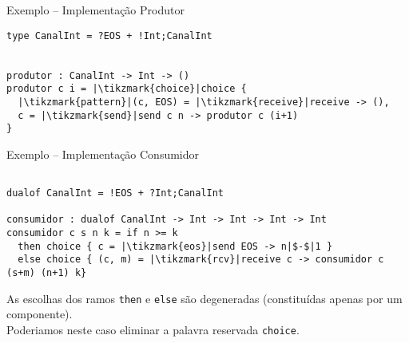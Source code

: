 \begin{frame}[fragile]{Exemplo -- Implementação  \hfill \color{mLightBrown}Produtor}
  \begin{lstlisting}[xleftmargin=.15\textwidth, xrightmargin=.15\textwidth]
type CanalInt = ?EOS + !Int;CanalInt

    
produtor : CanalInt -> Int -> ()
produtor c i = |\tikzmark{choice}|choice {
  |\tikzmark{pattern}|(c, EOS) = |\tikzmark{receive}|receive -> (),
  c = |\tikzmark{send}|send c n -> produtor c (i+1)
}
  \end{lstlisting}


  
\end{frame}


\begin{frame}[fragile]{Exemplo -- Implementação  \hfill \color{mLightBrown}Consumidor}
  \begin{lstlisting}[xleftmargin=-.04\textwidth]

dualof CanalInt = !EOS + ?Int;CanalInt
    
consumidor : dualof CanalInt -> Int -> Int -> Int -> Int
consumidor c s n k = if n >= k
  then choice { c = |\tikzmark{eos}|send EOS -> n|$-$|1 }
  else choice { (c, m) = |\tikzmark{rcv}|receive c -> consumidor c (s+m) (n+1) k}
\end{lstlisting}

 
\begin{tcolorbox}
  As escolhas dos ramos \lstinline|then| e \lstinline|else| são degeneradas (constituídas apenas por um componente).\\
  Poderiamos neste caso eliminar a palavra reservada \lstinline|choice|.
\end{tcolorbox}

\end{frame}

